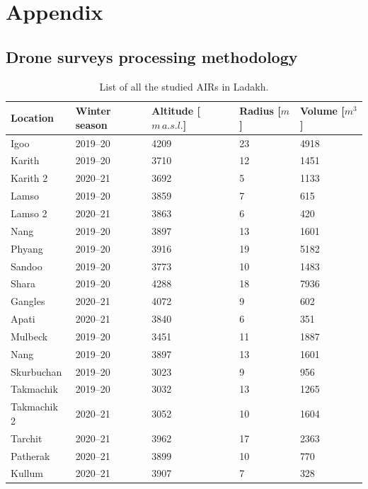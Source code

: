 %
\chapter{Appendix}
\label{sec:appendix}

\section{Drone surveys processing methodology}
\label{sec:drone_method}

\begin{table}
  \centering
  \caption{List of all the studied AIRs in Ladakh.}
	\label{tab:Ladakh_AIRs}
	\begin{tabular}{|lllll|}
    \hline
    \textbf{Location}     & \textbf{Winter season} & \textbf{Altitude [$m\,a.s.l.$]} & \textbf{
    Radius [$m$]} & \textbf{Volume [$m^3$]} \\ \hline
    Igoo & 2019--20 & 4209 & 23 & 4918  \\
    Karith & 2019--20 & 3710 & 12 & 1451  \\
    Karith 2 & 2020--21 & 3692 & 5 & 1133  \\
    Lamso & 2019--20 & 3859 & 7 & 615  \\
    Lamso 2& 2020--21 & 3863 & 6 & 420  \\
    Nang& 2019--20 & 3897 & 13 & 1601 \\
    Phyang& 2019--20 & 3916 & 19 & 5182 \\
    Sandoo& 2019--20 & 3773 & 10 & 1483 \\
    Shara& 2019--20 & 4288 & 18 & 7936 \\
    Gangles& 2020--21 & 4072 & 9 & 602 \\
    Apati& 2020--21 & 3840 & 6 & 351 \\
    Mulbeck& 2019--20 & 3451 & 11 & 1887\\
    Nang& 2019--20 & 3897 & 13 & 1601\\
    Skurbuchan& 2019--20 & 3023 & 9 & 956\\
    Takmachik& 2019--20 & 3032 & 13 &1265\\
    Takmachik 2& 2020--21 & 3052 & 10 &1604\\
    Tarchit& 2020--21 & 3962 & 17 &2363\\
    Patherak& 2020--21 & 3899 & 10 &770\\
    Kullum& 2020--21 & 3907 & 7 &328\\ \hline
	\end{tabular}
\end{table}


